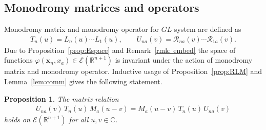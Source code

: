 \documentclass[11pt]{article}
\numberwithin{equation}{section}
\theoremstyle{plain}
\newtheorem{proposition}{Proposition}
\theoremstyle{definition}
\renewcommand{\phi}{\varphi}
\begin{document}
\subsection{Monodromy matrices and operators} \label{sec:app-monodr}

Monodromy matrix and monodromy operator for $GL$ system are defined as
\begin{align} \label{mon-op2}
	T_n(u) = L_n(u) \cdots L_1(u), \qquad U_{na}(v) = \mathcal{R}_{na}(v) \cdots \mathcal{R}_{1a}(v).
\end{align}
Due to Proposition~\ref{prop:Espace} and Remark~\ref{rmk: embed} the space of functions $\phi(\bm{x}_n, x_a) \in \mathcal{E}(\mathbb{R}^{n + 1})$ is invariant under the action of monodromy matrix and monodromy operator. Inductive usage of Proposition~\ref{prop:RLM} and Lemma~\ref{lem:comm} gives the following statement.

\begin{proposition} \label{prop:UTM}
	The matrix relation
	\begin{align} \label{UTM2}
		U_{na}(v) \, T_n(u) \, M_a(u - v) = M_a(u - v) \, T_n(u) \, U_{na}(v)
	\end{align}
	holds on $\mathcal{E}(\mathbb{R}^{n + 1})$ for all $u,v \in \mathbb{C}$. 
\end{proposition}
\end{document}
